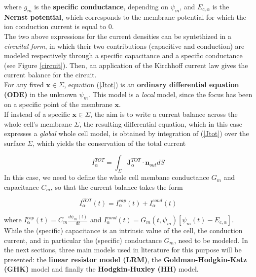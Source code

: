 \documentclass[12pt, a4paper]{report}
\begin{document}
where $g_m$ is the \textbf{specific conductance}, depending on $\psi_m$, and $E_{c,\alpha}$ is the \textbf{Nernst potential}, which corresponds to the  membrane potential for which the ion conduction current is equal to $0$.\\
The two above expressions for the current densities can be syntethized in a \textit{circuital form}, in which their two contributions (capacitive and conduction) are modeled respectively through a specific capacitance and a specific conductance (see Figure \ref{circuit}). Then, an application of the Kirchhoff current law  gives the current balance for the circuit.\\
For any fixed $\textbf{x} \in \Sigma$,  equation (\ref{Jtot}) is an \textbf{ordinary differential equation (ODE)} in the unknown $\psi_m$. This model is a \textit{local} model, since the focus has been on a specific point of the membrane $\textbf{x}$.
\\
If instead of a specific $\textbf{x} \in \Sigma$, the aim is to write a current balance across the whole cell's membrane $\Sigma$, the resulting differential equation, which in this case expresses a \textit{global} whole cell model, is obtained by integration of (\ref{Jtot})  over the surface $\Sigma$,  which yields the conservation of the total current 

\begin{equation}
I_{\alpha}^{TOT} = \int_{\Sigma} \textbf{J}_{\alpha}^{TOT} \cdot \textbf{n}_{out} dS 
\end{equation} 
In this case, we need to define the whole cell membane conductance $ G_m$ and capacitance $ C_m $, so that the current balance takes the form

\begin{equation}
I_{\alpha}^{TOT}(t) = I_{\alpha}^{cap}(t) + I_{\alpha}^{cond}(t)
\end{equation}

where $  I_{\alpha}^{cap}(t) = C_m \frac{d \psi_m(t)}{d t}$ and $ I_{\alpha}^{cond}(t) = G_m(t,\psi_m) [\psi_m(t) - E_{c,\alpha}]$.\\
While the (specific) capacitance is an intrinsic value of the cell, the conduction current, and  in particular the (specific) conductance $G_m$, need to be modeled. In the next sections, three main models used in literature for this purpose will be presented: the \textbf{linear resistor model (LRM)}, the \textbf{Goldman-Hodgkin-Katz (GHK)} model and finally the \textbf{Hodgkin-Huxley (HH)} model.\\
\end{document}
